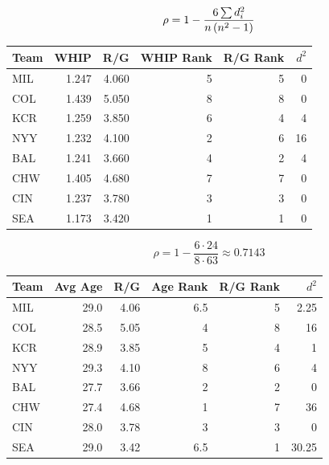 \documentclass[landscape]{exam}
\begin{document}
  \[
    \rho = 1 - \frac{6 \sum d_i^2}{n \del{n^2 - 1}}
  \]

  \begin{table}[H]
    \centering
    \begin{tabular}{lrrrrr}
      \toprule
      Team & WHIP  & R/G   & WHIP Rank & R/G Rank & $d^2$ \\
      \midrule
      MIL  & 1.247 & 4.060 & 5         & 5        & 0 \\
      COL  & 1.439 & 5.050 & 8         & 8        & 0 \\
      KCR  & 1.259 & 3.850 & 6         & 4        & 4 \\
      NYY  & 1.232 & 4.100 & 2         & 6        & 16 \\
      BAL  & 1.241 & 3.660 & 4         & 2        & 4 \\
      CHW  & 1.405 & 4.680 & 7         & 7        & 0 \\
      CIN  & 1.237 & 3.780 & 3         & 3        & 0 \\
      SEA  & 1.173 & 3.420 & 1         & 1        & 0 \\
      \bottomrule
    \end{tabular}
  \end{table}

  \[
    \rho = 1 - \frac{6 \cdot 24}{8 \cdot 63} \approx 0.7143
  \]

  \begin{table}[H]
    \centering
    \begin{tabular}{lrrrrr}
      \toprule
      Team & Avg Age & R/G  & Age Rank & R/G Rank & $d^2$ \\
      \midrule
      MIL  & 29.0    & 4.06 & 6.5      & 5        & 2.25 \\
      COL  & 28.5    & 5.05 & 4        & 8        & 16 \\
      KCR  & 28.9    & 3.85 & 5        & 4        & 1 \\
      NYY  & 29.3    & 4.10 & 8        & 6        & 4 \\
      BAL  & 27.7    & 3.66 & 2        & 2        & 0 \\
      CHW  & 27.4    & 4.68 & 1        & 7        & 36 \\
      CIN  & 28.0    & 3.78 & 3        & 3        & 0 \\
      SEA  & 29.0    & 3.42 & 6.5      & 1        & 30.25 \\
      \bottomrule
    \end{tabular}
  \end{table}
\end{document}
